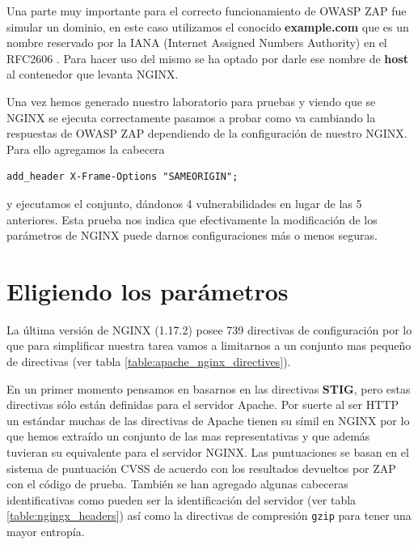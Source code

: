 \bigskip
Una parte muy importante para el correcto funcionamiento de OWASP ZAP fue simular un dominio, en este caso utilizamos el conocido \textbf{example.com} que es un nombre reservado por la IANA (Internet Assigned Numbers Authority) en el RFC2606 \cite{eastlake_reserved_1999}. Para hacer uso del mismo se ha optado por darle ese nombre de \textbf{host} al contenedor que levanta NGINX.

\bigskip
Una vez hemos generado nuestro laboratorio para pruebas y viendo que se NGINX se ejecuta correctamente pasamos a probar como va cambiando la respuestas de OWASP ZAP dependiendo de la configuración de nuestro NGINX. Para ello agregamos la cabecera \begin{verbatim}add_header X-Frame-Options "SAMEORIGIN";\end{verbatim} y ejecutamos el conjunto, dándonos 4 vulnerabilidades en lugar de las 5 anteriores. Esta prueba nos indica que efectivamente la modificación de los parámetros de NGINX puede darnos configuraciones más o menos seguras.

\section{Eligiendo los parámetros}

La última versión de NGINX (1.17.2) posee 739 directivas de configuración por lo que para simplificar nuestra tarea vamos a limitarnos a un conjunto mas pequeño de directivas (ver tabla \ref{table:apache_nginx_directives}).

\bigskip
En un primer momento pensamos en basarnos en las directivas \textbf{STIG}, pero estas directivas sólo están definidas para el servidor Apache. Por suerte al ser HTTP un estándar muchas de las directivas de Apache tienen su símil en NGINX por lo que hemos extraído un conjunto de las mas representativas y que además tuvieran su equivalente para el servidor NGINX. Las puntuaciones se basan en el sistema de puntuación CVSS de acuerdo con los resultados devueltos por ZAP con el código de prueba. También se han agregado algunas cabeceras identificativas como pueden ser la identificación del servidor (ver tabla \ref{table:ngingx_headers}) así como la directivas de compresión \texttt{gzip} para tener una mayor entropía.

